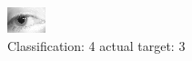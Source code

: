 \begin{figure}[h!]
\begin{center}
\includegraphics[width=0.60\columnwidth]{figures/ID1355_class_4_target_3.png}
\end{center}
\caption{ Classification: 4 actual target: 3}
\label{fig:ID1355_class_4_target_3}
\end{figure}

